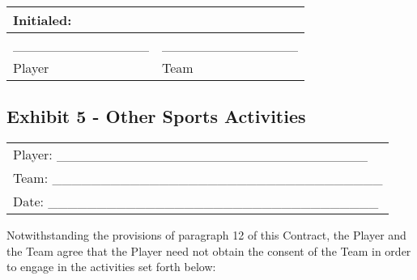 \documentclass[
]{book}
\begin{document}
\begin{longtable}[]{@{}ll@{}}
\toprule()
Initialed: & \\
\midrule()
\endhead
\_\_\_\_\_\_\_\_\_\_\_\_\_\_ & \_\_\_\_\_\_\_\_\_\_\_\_\_\_ \\
Player & Team \\
\bottomrule()
\end{longtable}

\newpage

\hypertarget{exhibit-5---other-sports-activities}{%
\subsection{Exhibit 5 - Other Sports Activities}\label{exhibit-5---other-sports-activities}}

\begin{longtable}[]{@{}l@{}}
\toprule()
\endhead
Player: \_\_\_\_\_\_\_\_\_\_\_\_\_\_\_\_\_\_\_\_\_\_\_\_\_\_\_\_\_\_\_\_ \\
Team: \_\_\_\_\_\_\_\_\_\_\_\_\_\_\_\_\_\_\_\_\_\_\_\_\_\_\_\_\_\_\_\_\_\_ \\
Date: \_\_\_\_\_\_\_\_\_\_\_\_\_\_\_\_\_\_\_\_\_\_\_\_\_\_\_\_\_\_\_\_\_\_ \\
\bottomrule()
\end{longtable}

Notwithstanding the provisions of paragraph 12 of this Contract, the Player and the Team agree that the Player need not obtain the consent of the Team in order to engage in the activities set forth below:
\end{document}
